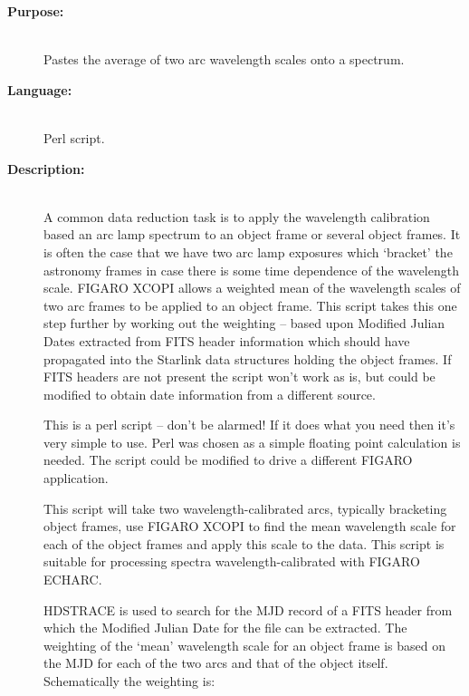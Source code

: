 \documentclass[twoside,11pt]{article}
\newcommand{\xref}[3]{#1}
\newcommand{\scspec}[2]{#1}
\newcommand{\scspec}[2]{#2}
\begin{document}
\begin{description}

\item [{\bf Purpose:}] \mbox{} \\
     Pastes the average of two arc wavelength scales onto a spectrum.

\item [{\bf Language:}] \mbox{} \\
     Perl script.

\item [{\bf Description:}] \mbox{} \\
     A common data reduction task is to apply the wavelength calibration
     based an arc lamp spectrum to an object frame or several object
     frames.  It is often the case that we have two arc lamp exposures which
     `bracket' the astronomy frames in case there is some time dependence
     of the wavelength scale.  \xref{FIGARO}{sun86}{}
     \xref{XCOPI}{sun86}{XCOPI} allows a weighted mean of the
     wavelength scales of two arc frames to be applied to an object frame.
     This script takes this one step further by working out the weighting
     \scspec{--}{-}
     based upon Modified Julian Dates extracted from FITS header
     information which should have propagated into the Starlink data
     structures holding the object frames.  If FITS headers are not present
     the script won't work as is, but could be modified to obtain date
     information from a different source.

     This is a perl script \scspec{--}{-} don't be alarmed!
     If it does what you need then it's very simple to use.
     Perl was chosen as a simple floating point calculation is needed.
     The script could be modified to drive a different FIGARO application.

     This script will take two wavelength-calibrated arcs, typically
     bracketing object frames, use FIGARO XCOPI to find the mean
     wavelength scale for each of the object frames and apply this
     scale to the data.  This script is suitable for processing spectra
     wavelength-calibrated with FIGARO \xref{ECHARC}{sun86}{ECHARC}.

     \xref{HDSTRACE}{sun102}{} is used to search for the MJD record of a
     FITS header from which the Modified Julian Date for the file can be
     extracted.  The weighting of the `mean' wavelength scale for an
     object frame is based on the MJD for each of the two arcs and that
     of the object itself.  Schematically the weighting is:


\end{description}
\end{document}
